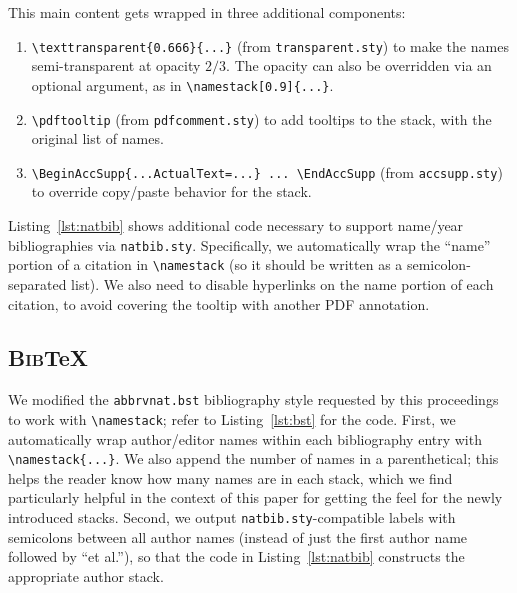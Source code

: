 \documentclass[natbib,authoryear]{sigtbd17-style}
\def\BibTeX{\textsc{Bib}\TeX}
\begin{document}
This main content gets wrapped in three additional components:
%
\begin{enumerate}
\item \lstinline|\texttransparent{0.666}{...}| (from \texttt{transparent.sty})
  to make the names semi-transparent at opacity $2/3$.
  The opacity can also be overridden via an optional argument, as in
  \lstinline|\namestack[0.9]{...}|.
\item \lstinline|\pdftooltip| (from \texttt{pdfcomment.sty})
  to add tooltips to the stack, with the original list of names.
\item \lstinline|\BeginAccSupp{...ActualText=...} ... \EndAccSupp|
  (from \texttt{accsupp.sty}) to override copy/paste behavior for the stack.
\end{enumerate}

Listing~\ref{lst:natbib} shows additional code necessary to support
name/year bibliographies via \texttt{natbib.sty}.  Specifically, we
automatically wrap the ``name'' portion of a citation in
\lstinline|\namestack| (so it should be written as a semicolon-separated list).
We also need to disable hyperlinks on the name portion of each citation,
to avoid covering the tooltip with another PDF annotation.



\subsection{\BibTeX}


We modified the \texttt{abbrvnat.bst} bibliography style requested by this
proceedings to work with \lstinline|\namestack|;
refer to Listing~\ref{lst:bst} for the code.
First, we automatically wrap author/editor names within each bibliography entry
with \lstinline|\namestack{...}|.
We also append the number of names in a parenthetical;
this helps the reader know how many names are in each stack,
which we find particularly helpful in the context of this paper
for getting the feel for the newly introduced stacks.
Second, we output \texttt{natbib.sty}-compatible labels with semicolons
between all author names (instead of just the first author name followed by
``et al.''), so that the code in Listing~\ref{lst:natbib} constructs the
appropriate author stack.
\end{document}
